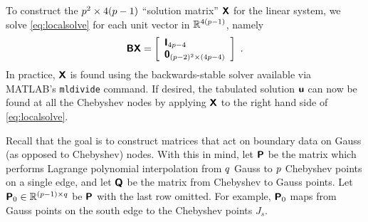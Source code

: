 \documentclass[11pt,final]{amsart}
\theoremstyle{definition}
\numberwithin{remark}{section}
\numberwithin{definition}{section}
\numberwithin{pro}{section}
\begin{document}
%
To construct the $p^{2} \times 4(p-1)$ ``solution matrix''
$\bm{\mathsf{X}}$ for the linear system, we
solve \eqref{eq:localsolve} for each unit vector in $\mathbb{R}^{4(p-1)}$,
namely
$$\mtx{B}\mtx{X} = \left[\begin{array}{l}
\mtx{I}_{4\Nc-4} \\ %
\mtx{0}_{(\Nc-2)^2\times(4\Nc-4)} \end{array}\right]
~.
$$
In practice, $\bm{\mathsf{X}}$ is found using the backwards-stable solver available via MATLAB's {\tt mldivide}
command.  If desired, the tabulated solution $\bm{\mathsf{u}}$ can now
be found at all the Chebyshev nodes
by applying $\bm{\mathsf{X}}$ to the right hand side of \eqref{eq:localsolve}.

Recall that the goal is to construct matrices that act on boundary data on
Gauss (as opposed to Chebyshev) nodes.
With this in mind, let $\bm{\mathsf{P}}$
be the matrix which performs Lagrange polynomial
interpolation \cite[Ch.~12]{tyrt}
from $q$ Gauss to $p$ Chebyshev points on a single edge,
and let $\bm{\mathsf{Q}}$ be the matrix from Chebyshev to Gauss points.
Let $\bm{\mathsf{P}}_0\in\mathbb{R}^{(p-1)\times q}$ be $\bm{\mathsf{P}}$ with the last row
omitted. For example, $\bm{\mathsf{P}}_0$ maps from Gauss points on the south edge to
the Chebyshev points $J_s$. %
\end{document}
